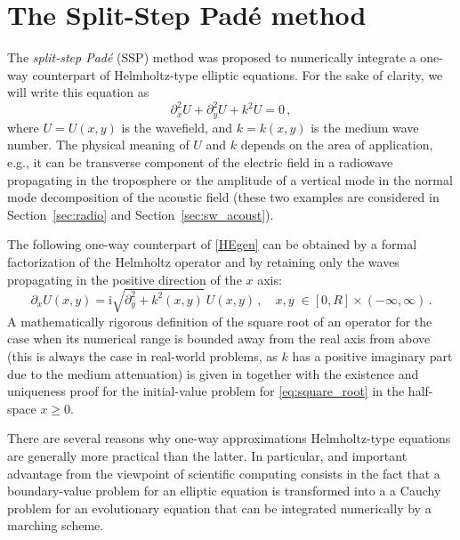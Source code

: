\documentclass[11pt,a4paper]{article}
\newcommand{\iu}{\mathrm{i}} %
\theoremstyle{plain}%
\theoremstyle{definition}
\theoremstyle{remark}
\begin{document}
\section{The Split-Step Pad\'e method}\label{sec:SSP_classical}
The \textit{split-step Pad\'e} (SSP) method was proposed to numerically integrate a one-way counterpart of Helmholtz-type elliptic equations. 
For the sake of clarity, we will write this equation as
\begin{equation}\label{HEgen}
    \partial_x^2 U + \partial_y^2 U + k^2U = 0\,,
\end{equation}
where $U = U(x,y)$ is the wavefield, and $k = k(x,y)$ is the medium wave number. 
The physical meaning of $U$ and $k$ depends on the area of application, e.g., it can be transverse component of the electric field in a radiowave propagating in the troposphere or the amplitude of a vertical mode in the normal mode decomposition of the acoustic field (these two examples are considered in Section~\ref{sec:radio} and Section~\ref{sec:sw_acoust}). 

The following one-way counterpart of \eqref{HEgen} can be obtained by a formal factorization of the Helmholtz operator and by retaining only the waves propagating in the positive direction of the $x$ axis:
\begin{equation}\label{eq:square_root}
    \partial_x U (x,y) = \iu\sqrt{\partial_y^2+k^2(x,y)} \,U(x, y) \,,\quad x,y\; \in  [0,R]\times(-\infty,\infty)\,.
\end{equation}
A mathematically rigorous definition of the square root of an operator for the case when its numerical range is bounded away from the real axis from above (this is always the case in real-world problems, as $k$ has a positive imaginary part due to the medium attenuation) is given in \cite{ehrhardt2025square} together with the existence and uniqueness proof for the initial-value problem for \eqref{eq:square_root} in the half-space $x\ge0$.

There are several reasons why one-way approximations Helmholtz-type equations are generally more practical than the latter. 
In particular, and important advantage from the viewpoint of scientific computing consists in the fact that a boundary-value problem for an elliptic equation is transformed into a a Cauchy problem for an evolutionary equation that can be integrated numerically by a marching scheme.
\end{document}
